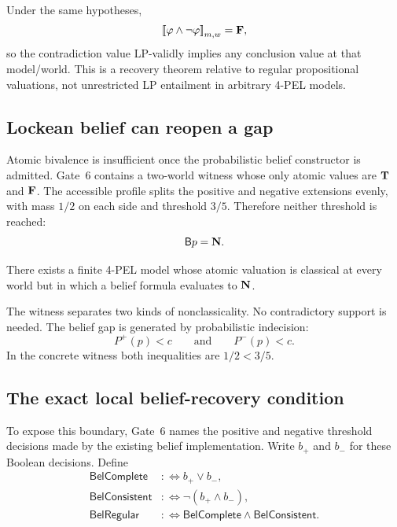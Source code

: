 \begin{corollary}
\label{cor:formula-efq-recovery}
Under the same hypotheses,
\[
  \mathopen{[\![}\varphi\land\neg\varphi\mathclose{]\!]}_{m,w}=\mathbf{F},
\]
so the contradiction value LP-validly implies any conclusion value at that
model/world.  This is a recovery theorem relative to regular propositional
valuations, not unrestricted LP entailment in arbitrary 4-PEL models.
\statusverified
\end{corollary}

\subsection{Lockean belief can reopen a gap}

Atomic bivalence is insufficient once the probabilistic belief constructor is
admitted.  Gate~6 contains a two-world witness whose only atomic values are
\(\mathbf{T}\) and \(\mathbf{F}\).  The accessible profile splits the positive and negative
extensions evenly, with mass \(1/2\) on each side and threshold \(3/5\).  Therefore
neither threshold is reached:
\[
  \mathsf{B} p = \mathbf{N}.
\]

\begin{proposition}
\label{prop:belief-reopens-gap}
There exists a finite 4-PEL model whose atomic valuation is classical at every world
but in which a belief formula evaluates to \(\mathbf{N}\).
\statuswitness
\end{proposition}

The witness separates two kinds of nonclassicality.  No contradictory support is
needed.  The belief gap is generated by probabilistic indecision:
\[
  P^+(p)<c
  \qquad\text{and}\qquad
  P^-(p)<c.
\]
In the concrete witness both inequalities are \(1/2<3/5\).

\subsection{The exact local belief-recovery condition}

To expose this boundary, Gate~6 names the positive and negative threshold decisions
made by the existing belief implementation.  Write \(b_+\) and \(b_-\) for these
Boolean decisions.  Define
\begin{align*}
  \mathsf{BelComplete} &:\Longleftrightarrow b_+\lor b_-,\\
  \mathsf{BelConsistent} &:\Longleftrightarrow \neg(b_+\land b_-),\\
  \mathsf{BelRegular} &:\Longleftrightarrow
    \mathsf{BelComplete}\land\mathsf{BelConsistent}.
\end{align*}

